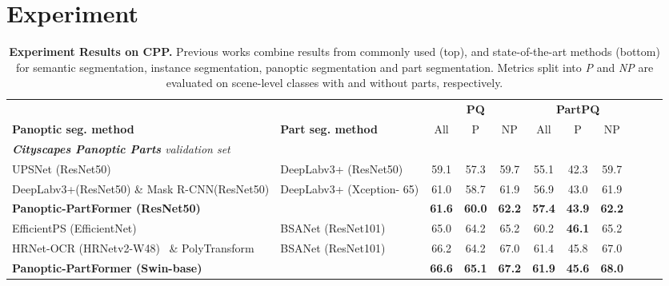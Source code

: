 \section{Experiment}
\label{sec:experiment}




\begin{table*}[t]
\centering
\begin{adjustbox}{width=0.95\textwidth}
\begin{tabular}{ll||cc|ccc|c||ccc}
\bottomrule
 &  & \multicolumn{3}{c|}{\textbf{PQ}} & \multicolumn{3}{c}{\textbf{PartPQ}} \\ 
\textbf{Panoptic seg. method}  &  \textbf{Part seg. method}  & All & P & NP & All & P & NP \\ 
\midrule

\textit{\textbf{Cityscapes Panoptic Parts} validation set} \\
UPSNet \cite{xiong2019upsnet}(ResNet50) & DeepLabv3+ \cite{deeplabv3plus}(ResNet50)  & 59.1 & 57.3 & 59.7  & 55.1 & 42.3 & 59.7 \\
DeepLabv3+(ResNet50) \& Mask R-CNN(ResNet50) \cite{maskrcnn} & DeepLabv3+ \cite{deeplabv3plus} (Xception-
65)  & 61.0 & 58.7 & 61.9 &  56.9 & 43.0 & 61.9  \\
\hline
\textbf{Panoptic-PartFormer (ResNet50)}  & & \textbf{61.6} & \textbf{60.0} & \textbf{62.2} & \textbf{57.4} & \textbf{43.9} & \textbf{62.2} \\ 
\hline

EfficientPS \cite{mohan2021efficientps}(EfficientNet)~\cite{tan2019efficientnet} &  BSANet \cite{Zhao2019BSANet}(ResNet101)   & 65.0 & 64.2 & 65.2   & 60.2 & \textbf{46.1} & 65.2  \\
HRNet-OCR (HRNetv2-W48)~\cite{ocrnet,wang2020deep} \& PolyTransform~\cite{liang2020polytransform} &  BSANet \cite{Zhao2019BSANet}(ResNet101)  & 66.2 & 64.2 & 67.0  & 61.4 & 45.8 & 67.0 \\
\hline


\textbf{Panoptic-PartFormer (Swin-base)} & & \textbf{66.6}  & \textbf{65.1}  & \textbf{67.2}  & \textbf{61.9}  & \textbf{45.6} & \textbf{68.0}  \\

\bottomrule
\end{tabular}
\end{adjustbox}
\caption{\small \textbf{Experiment Results on CPP.} Previous works combine results from commonly used (top), and state-of-the-art methods (bottom) for semantic segmentation, instance segmentation, panoptic segmentation and part segmentation. Metrics split into \textit{P} and \textit{NP} are evaluated on scene-level classes with and without parts, respectively.}
\label{tab:experiments_res_city}
\end{table*}


